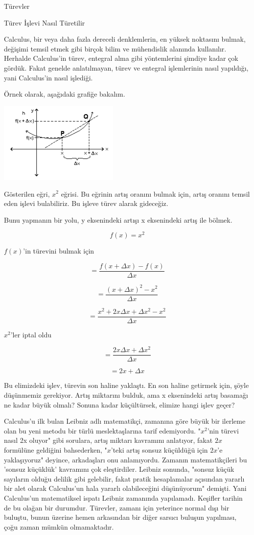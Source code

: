 \documentclass[12pt,fleqn]{article}\usepackage{../../common}
\begin{document}
Türevler

Türev İşlevi Nasıl Türetilir

Calculus, bir veya daha fazla dereceli denklemlerin, en yüksek noktasını
bulmak, değişimi temsil etmek gibi birçok bilim ve mühendislik alanında
kullanılır. Herhalde Calculus'in türev, entegral alma gibi yöntemlerini
şimdiye kadar çok gördük. Fakat genelde anlatılmayan, türev ve entegral
işlemlerinin nasıl yapıldığı, yani Calculus'in nasıl işlediği.

Örnek olarak, aşağıdaki grafiğe bakalım. 

\includegraphics[height=4cm]{calc_multi_app_10.png}

Gösterilen eğri, $x^2$ eğrisi. Bu eğrinin artış oranını bulmak için, artış
oranını temsil eden işlevi bulabiliriz. Bu işleve türev alarak gideceğiz.

Bunu yapmanın bir yolu, y eksenindeki artışı x eksenindeki artış ile
bölmek. 

$$ f(x) = x^2 $$

$f(x)$'in türevini bulmak için 

$$ = \frac{f(x+\Delta x) - f(x)}{\Delta x} $$

$$ = \frac{(x+\Delta x)^2 - x^2}{\Delta x} $$

$$ = \frac{x^2 + 2x\Delta x + \Delta x^2 - x^2}{\Delta x} $$

$x^2$'ler iptal oldu

$$=  \frac{2x\Delta x + \Delta x^2}{\Delta x} $$


$$ = 2x + \Delta x $$

Bu elimizdeki işlev, türevin son haline yaklaştı. En son haline getirmek
için, şöyle düşünmemiz gerekiyor. Artış miktarını bulduk, ama x eksenindeki
artış basamağı ne kadar büyük olmalı? Sonuna kadar küçültürsek, elimize
hangi işlev geçer?

Calculus'u ilk bulan Leibniz adlı matematikçi, zamanına göre büyük bir
ilerleme olan bu yeni metodu bir türlü meslektaşlarına tarif
edemiyordu. "$x^2$'nin türevi nasıl 2x oluyor" gibi sorulara, artış miktarı
kavramını anlatıyor, fakat $2x$ formülüne geldiğini bahsederken, "$x$'teki
artış sonsuz küçüldüğü için $2x$'e yaklaşıyoruz" deyince, arkadaşları onu
anlamıyordu. Zamanın matematikçileri bu 'sonsuz küçüklük' kavramını çok
eleştirdiler. Leibniz sonunda, "sonsuz küçük sayıların olduğu delilik gibi
gelebilir, fakat pratik hesaplamalar açısından yararlı bir alet olarak
Calculus'un hala yararlı olabileceğini düşünüyorum" demişti. Yani
Calculus'un matematiksel ispatı Leibniz zamanında yapılamadı. Keşifler
tarihin de bu olağan bir durumdur. Türevler, zamanı için yeterince normal
dışı bir buluştu, bunun üzerine hemen arkasından bir diğer sarsıcı buluşun
yapılması, çoğu zaman mümkün olmamaktadır.
\end{document}
